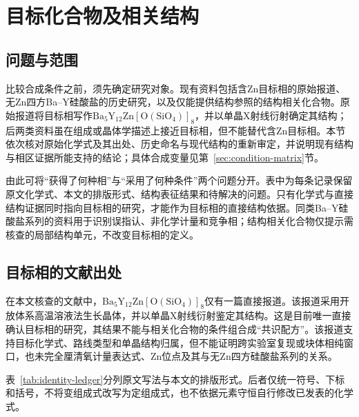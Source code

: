 \section{目标化合物及相关结构}
\label{sec:identity}

\subsection{问题与范围}

比较合成条件之前，须先确定研究对象。现有资料包括含Zn目标相的原始报道、无Zn四方Ba--Y硅酸盐的历史研究，以及仅能提供结构参照的结构相关化合物。原始报道将目标相写作$\mathrm{Ba_5Y_{12}Zn[O(SiO_4)]_8}$，并以单晶X射线衍射确定其结构\cite{ababaikeri2024ba5y12zn}；后两类资料虽在组成或晶体学描述上接近目标相，但不能替代含Zn目标相。本节依次核对原始化学式及其出处、历史命名与现代结构的重新审定，并说明现有结构与相区证据所能支持的结论；具体合成变量见第~\ref{sec:condition-matrix}\CJKecglue{}节。

由此可将“获得了何种相”与“采用了何种条件”两个问题分开。表中为每条记录保留原文化学式、本文的排版形式、结构表征结果和待解决的问题。只有化学式与直接结构证据同时指向目标相的研究，才能作为目标相的直接结构依据。同类Ba--Y硅酸盐系列的资料用于识别误指认、非化学计量和竞争相；结构相关化合物仅提示需核查的局部结构单元，不改变目标相的定义。

\subsection{目标相的文献出处}

在本文核查的文献中，$\mathrm{Ba_5Y_{12}Zn[O(SiO_4)]_8}$仅有一篇直接报道\cite{ababaikeri2024ba5y12zn}。该报道采用开放体系高温溶液法生长晶体，并以单晶X射线衍射鉴定其结构\cite{ababaikeri2024ba5y12zn}。这是目前唯一直接确认目标相的研究，其结果不能与相关化合物的条件组合成“共识配方”。该报道支持目标化学式、路线类型和单晶结构归属，但不能证明跨实验室复现或块体相纯窗口，也未完全厘清氧计量表达式、Zn位点及其与无Zn四方硅酸盐系列的关系。

表~\ref{tab:identity-ledger}\CJKecglue{}分列原文写法与本文的排版形式。后者仅统一符号、下标和括号，不将变组成式改写为定组成式，也不依据元素守恒自行修改已发表的化学式。

